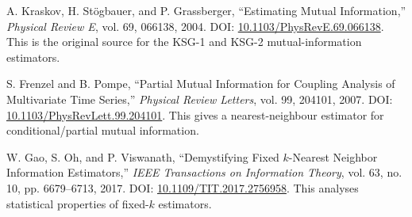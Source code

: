 \documentclass[11pt,letterpaper,oneside]{report}
\begin{document}
\begin{enumerate}[label={[\arabic*]}]
\item A. Kraskov, H. St\"ogbauer, and P. Grassberger, “Estimating Mutual Information,” \emph{Physical Review E}, vol. 69, 066138, 2004. DOI: \href{https://doi.org/10.1103/PhysRevE.69.066138}{10.1103/PhysRevE.69.066138}. This is the original source for the KSG-1 and KSG-2 mutual-information estimators.
\item S. Frenzel and B. Pompe, “Partial Mutual Information for Coupling Analysis of Multivariate Time Series,” \emph{Physical Review Letters}, vol. 99, 204101, 2007. DOI: \href{https://doi.org/10.1103/PhysRevLett.99.204101}{10.1103/PhysRevLett.99.204101}. This gives a nearest-neighbour estimator for conditional/partial mutual information.
\item W. Gao, S. Oh, and P. Viswanath, “Demystifying Fixed $k$-Nearest Neighbor Information Estimators,” \emph{IEEE Transactions on Information Theory}, vol. 63, no. 10, pp. 6679--6713, 2017. DOI: \href{https://doi.org/10.1109/TIT.2017.2756958}{10.1109/TIT.2017.2756958}. This analyses statistical properties of fixed-$k$ estimators.
\end{enumerate}
\end{document}
